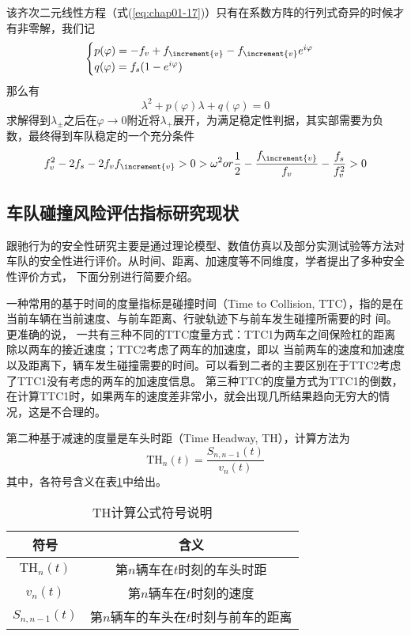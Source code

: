 该齐次二元线性方程（式(\ref{eq:chap01-17})）只有在系数方阵的行列式奇异的时候才有非零解，我们记
\begin{equation}
  \begin{cases}
    p(\varphi) = -f_v + f_{\increment{v}} - f_{\increment{v}}e^{i\varphi} \\
    q(\varphi) = f_s(1-e^{\-i\varphi})
  \end{cases}
  \label{eq:chap01-18}
\end{equation}
那么有
\begin{equation}
  \lambda^2 + p(\varphi)\lambda + q(\varphi) = 0
  \label{eq:chap01-19}
\end{equation}
求解得到$\lambda_{\pm}$之后在$\varphi \rightarrow 0$附近将$\lambda_+$展开，为满足稳定性判据，其实部需要为负数，最终得到车队稳定的一个充分条件
\begin{equation}
  f_v^2 - 2f_s -2f_vf_{\increment{v}} >0>\-\omega^2 or \frac{1}{2} - \frac{f_{\increment{v}}}{f_v} - \frac{f_s}{f_v^2} > 0
  \label{eq:chap01-20}
\end{equation}

\subsection{车队碰撞风险评估指标研究现状}

跟驰行为的安全性研究主要是通过理论模型、数值仿真以及部分实测试验等方法对车队的安全性进行评价。从时间、距离、加速度等不同维度，学者提出了多种安全性评价方式，
下面分别进行简要介绍。

一种常用的基于时间的度量指标是碰撞时间（Time to Collision, TTC），指的是在当前车辆在当前速度、与前车距离、行驶轨迹下与前车发生碰撞所需要的时
间\cite{Horst1990ATA}。更准确的说， 一共有三种不同的TTC度量方式：TTC1为两车之间保险杠的距离除以两车的接近速度；TTC2考虑了两车的加速度，即以
当前两车的速度和加速度以及距离下，辆车发生碰撞需要的时间。可以看到二者的主要区别在于TTC2考虑了TTC1没有考虑的两车的加速度信息。
第三种TTC的度量方式为TTC1的倒数，在计算TTC1时，如果两车的速度差非常小，就会出现几所结果趋向无穷大的情况，这是不合理的。

第二种基于减速的度量是车头时距（Time Headway, TH），计算方法为
\begin{equation}
  \mathrm{TH}_n(t) = \frac{S_{n, n-1}(t)}{v_n(t)}
  \label{eq:chap01-21}
\end{equation}
其中，各符号含义在表\ref{tab:chap01-8}中给出。
\begin{table}
  \centering
  \caption{TH计算公式符号说明}
  \begin{tabular}{cc}
    \toprule
    符号          &  含义                         \\
    \midrule
    $\mathrm{TH}_n(t)$          &    第$n$辆车在$t$时刻的车头时距         \\
    $v_n(t)$           &    第$n$辆车在$t$时刻的速度       \\
    $S_{n, n-1}(t)$    &    第$n$辆车的车头在$t$时刻与前车的距离      \\
    \bottomrule
  \end{tabular}
  \label{tab:chap01-8}
\end{table}

